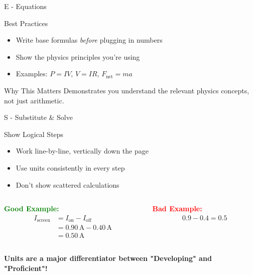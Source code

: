 \documentclass{beamer}
\begin{document}
\begin{frame}{E - Equations}
\begin{block}{Best Practices}
\begin{itemize}
\item Write base formulas \emph{before} plugging in numbers
\item Show the physics principles you're using
\item Examples: $P = IV$, $V = IR$, $F_{\text{net}} = ma$
\end{itemize}
\end{block}

\begin{block}{Why This Matters}
Demonstrates you understand the relevant physics concepts, not just arithmetic.
\end{block}

\end{frame}

\begin{frame}{S - Substitute \& Solve}
\begin{block}{Show Logical Steps}
\begin{itemize}
\item Work line-by-line, vertically down the page
\item Use units consistently in every step
\item Don't show scattered calculations
\end{itemize}
\end{block}

\begin{columns}
\begin{column}{0.5\textwidth}
\textcolor{green}{\textbf{Good Example:}}
\begin{align}
I_{\text{screen}} &= I_{\text{on}} - I_{\text{off}} \\
&= 0.90\,\text{A} - 0.40\,\text{A} \\
&= 0.50\,\text{A}
\end{align}
\end{column}
\begin{column}{0.5\textwidth}
\textcolor{red}{\textbf{Bad Example:}}
\begin{align}
0.9 - 0.4 = 0.5
\end{align}
\end{column}
\end{columns}

\vspace{1cm}

\textbf{Units are a major differentiator between "Developing" and "Proficient"!}
\end{frame}
\end{document}
